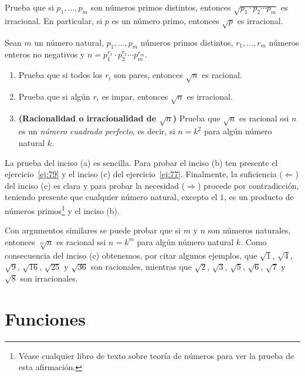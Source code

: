 \documentclass[12pt,a4paper]{book}
\begin{document}
    \begin{ejercicio}\label{ej:79}
        Prueba que si $p_{1},\ldots,p_{m}$ son números primos distintos, entonces
        $\sqrt{p_{1}\cdot p_{2}\cdots p_{m}}$ es irracional. En particular, si $p$ es un número primo, entonces
        $\sqrt{p}$ es irracional.
    \end{ejercicio}

    \begin{ejercicio}\label{ej:80}
        Sean $m$ un número natural, $p_{1},\ldots,p_{m}$ números primos distintos,
        $r_{1},\ldots,r_{m}$ números enteros no negativos y $n=p_{1}^{r_{1}}\cdot p_{2}^{r_{2}}\cdots p_{m}^{r_{m}}$.
        \begin{enumerate}[nosep]
            \item Prueba que si todos los $r_{i}$ son pares, entonces $\sqrt{n}$ es racional.
            \item Prueba que si algún $r_{i}$ es impar, entonces $\sqrt{n}$ es irracional.
            \item \textbf{(Racionalidad o irracionalidad de \boldmath$\sqrt{n}$)} Prueba que $\sqrt{n}$ es racional ssi
            $n$ es un \textit{número cuadrado perfecto}, es decir, si $n=k^{2}$ para algún número
            natural $k$.
        \end{enumerate}
        \sugerencia La prueba del inciso (a) es sencilla. Para probar el inciso (b)
        ten presente el ejercicio~\ref{ej:79} y el inciso (c) del ejercicio~\ref{ej:77}. Finalmente, la
        suficiencia ($\Leftarrow$) del inciso (c) es clara y para probar la necesidad ($\Rightarrow$) procede
        por contradicción, teniendo presente que cualquier número natural, excepto
        el $1$, es un producto de números primos\footnote{Véase cualquier libro de texto sobre teoría de números para ver la prueba de esta
        afirmación.} y el inciso (b).

        Con argumentos similares se puede probar que si $m$ y $n$ son números
        naturales, entonces $\sqrt[m]{n}$ es racional ssi $n=k^{m}$ para algún número natural $k$.
        Como consecuencia del inciso (c) obtenemos, por citar algunos ejemplos, que
        $\sqrt{1}$, $\sqrt{4}$, $\sqrt{9}$, $\sqrt{16}$, $\sqrt{25}$ y $\sqrt{36}$ son racionales, mientras que $\sqrt{2}$, $\sqrt{3}$, $\sqrt{5}$, $\sqrt{6}$,
        $\sqrt{7}$ y $\sqrt{8}$ son irracionales.
    \end{ejercicio}

    \chapter{Funciones}\label{cap:funciones}
\end{document}
